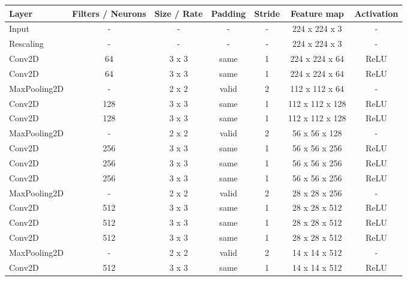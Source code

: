 \documentclass[10pt, final]{article}
\begin{document}
\begin{table}[!ht]
	\centering
	\begin{tabular}{l c c c c c c}
		Layer        & Filters / Neurons & Size / Rate & Padding & Stride & Feature map     & Activation \\
		\hline
		Input        & -                 & -           & -       & -      & 224 x 224 x 3   & -          \\
		Rescaling    & -                 & -           & -       & -      & 224 x 224 x 3   & -          \\
		Conv2D       & 64                & 3 x 3       & same    & 1      & 224 x 224 x 64  & ReLU       \\
		Conv2D       & 64                & 3 x 3       & same    & 1      & 224 x 224 x 64  & ReLU       \\
		MaxPooling2D & -                 & 2 x 2       & valid   & 2      & 112 x 112 x 64  & -          \\
		Conv2D       & 128               & 3 x 3       & same    & 1      & 112 x 112 x 128 & ReLU       \\
		Conv2D       & 128               & 3 x 3       & same    & 1      & 112 x 112 x 128 & ReLU       \\
		MaxPooling2D & -                 & 2 x 2       & valid   & 2      & 56 x 56 x 128   & -          \\
		Conv2D       & 256               & 3 x 3       & same    & 1      & 56 x 56 x 256   & ReLU       \\
		Conv2D       & 256               & 3 x 3       & same    & 1      & 56 x 56 x 256   & ReLU       \\
		Conv2D       & 256               & 3 x 3       & same    & 1      & 56 x 56 x 256   & ReLU       \\
		MaxPooling2D & -                 & 2 x 2       & valid   & 2      & 28 x 28 x 256   & -          \\
		Conv2D       & 512               & 3 x 3       & same    & 1      & 28 x 28 x 512   & ReLU       \\
		Conv2D       & 512               & 3 x 3       & same    & 1      & 28 x 28 x 512   & ReLU       \\
		Conv2D       & 512               & 3 x 3       & same    & 1      & 28 x 28 x 512   & ReLU       \\
		MaxPooling2D & -                 & 2 x 2       & valid   & 2      & 14 x 14 x 512   & -          \\
		Conv2D       & 512               & 3 x 3       & same    & 1      & 14 x 14 x 512   & ReLU       \\

\end{tabular}
\end{table}
\end{document}
